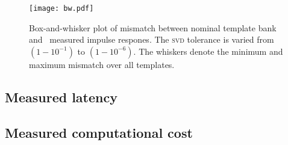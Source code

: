 \begin{figure}
	\label{fig:hist}
	\begin{center}
		\texttt{[image: bw.pdf]}
		\caption{Box-and-whisker plot of mismatch between nominal template bank and \lloid\ measured impulse respones.  The \textsc{svd} tolerance is varied from $\left(1-10^{-1}\right)$ to $\left(1-10^{-6}\right)$.  The whiskers denote the minimum and maximum mismatch over all templates.}
	\end{center}
\end{figure}


\subsection{Measured latency}

\subsection{Measured computational cost}



